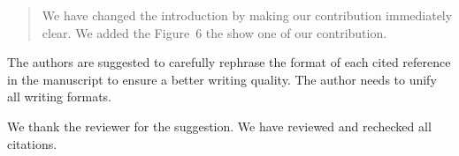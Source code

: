 \documentclass{article}
\begin{document}

\begin{quote}
	We have changed the introduction by making our contribution immediately clear. We added the Figure~6 the show one of our contribution.
\end{quote}

\RC The authors are suggested to carefully rephrase the format of each cited reference in the manuscript to ensure a better writing quality. The author needs to unify all writing formats.

\AR We thank the reviewer for the suggestion. We have reviewed and rechecked all citations.
\end{document}
